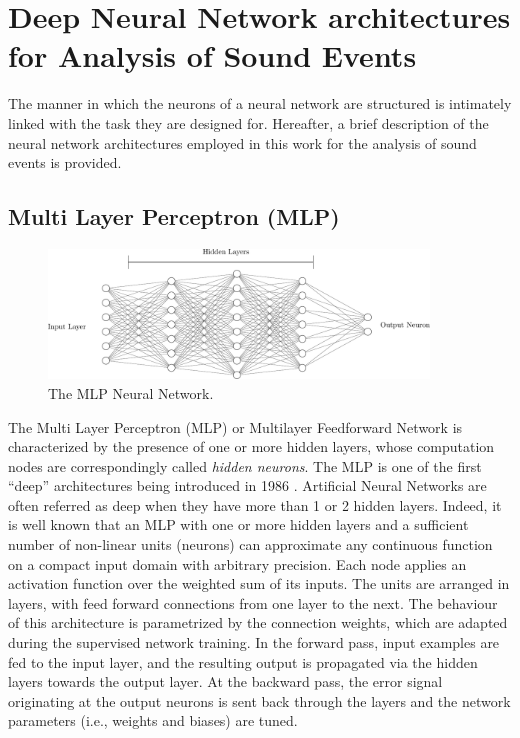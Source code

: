 \section{Deep Neural Network architectures for Analysis of Sound Events}

The manner in which the neurons of a neural network are structured is intimately linked with the task they are designed for. Hereafter, a brief description of the neural network architectures employed in this work for the analysis of sound events is provided.


\subsection{Multi Layer Perceptron (MLP)}

\begin{figure}[h]
	\centering
	\label{fig:ANN}
	\includegraphics[width=0.9\textwidth]{img/mlp}
	\caption{The MLP Neural Network.}
\end{figure}

The Multi Layer Perceptron (MLP) or Multilayer Feedforward Network is characterized by the presence of one or more hidden layers, whose computation nodes are correspondingly called \textit{hidden neurons}.
The MLP is one of the first ``deep'' architectures being introduced in 1986 \cite{Rumelhart86-LRB}. Artificial Neural Networks are often referred as deep when they have more than 1 or 2 hidden layers.
Indeed, it is well known that an  MLP with one or more hidden layers and a sufficient number of non-linear units (neurons) can  approximate any continuous  function  on  a  compact  input  domain  with arbitrary precision.
Each node applies an activation function over the weighted sum of its inputs. 
The units are arranged in layers, with feed forward connections from one layer to the next. 
The behaviour of this architecture  is  parametrized  by  the connection weights, which are adapted during the supervised network training.
In the forward pass, input examples are fed to the input layer, and the resulting output is propagated via the hidden layers towards the output layer. At the backward pass, the error signal originating at the output neurons is sent back through the layers and the network parameters (i.e., weights and biases) are tuned.

